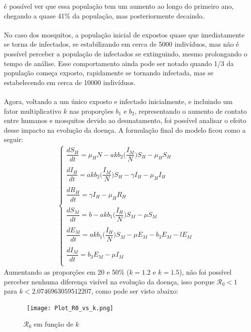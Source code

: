 é possível ver que essa população tem um aumento ao longo do primeiro ano, 
chegando a quase 41\% da população, mas posteriormente decaindo.
\\\\
No caso dos mosquitos, a população inicial de expostos quase que 
imediatamente se torna de infectados, se estabilizando em cerca de 5000 
indivíduos, mas não é possível perceber a população de infectados se 
extinguindo, mesmo prolongando o tempo de análise. Esse comportamento 
ainda pode ser notado quando 1/3 da população começa exposto, rapidamente 
se tornando infectada, mas se estabelecendo em cerca de 10000 indivíduos. 
\\\\
Agora, voltando a um único exposto e infectado inicialmente, e incluindo um fator
multiplicativo $k$ nas proporções $b_1$ e $b_2$, representando o aumento de contato
entre humanos e mosquitos devido ao desmatamento, foi possível analisar o efeito desse impacto
na evolução da doença. A formulação final do modelo ficou como a seguir:
\begin{gather*}
\begin{cases}
\dfrac{dS_H}{dt} = \mu_HN-akb_2\bigg(\dfrac{I_M}{N}\bigg)S_H - \mu_HS_H\\
\\
\dfrac{dI_H}{dt} = akb_2\bigg(\dfrac{I_M}{N}\bigg)S_H-\gamma I_H - \mu_HI_H\\
\\
\dfrac{dR_H}{dt} = \gamma I_H - \mu_HR_H\\
\\
\dfrac{dS_M}{dt} = b - akb_1\bigg(\dfrac{I_H}{N}\bigg)S_M - \mu S_M\\
\\
\dfrac{dE_M}{dt} = akb_1\bigg(\dfrac{I_H}{N}\bigg)S_M - \mu E_M - b_3E_M -lE_M\\
\\
\dfrac{dI_M}{dt} = b_3E_M -\mu I_M\\
\end{cases}
\end{gather*}
Aumentando as proporções em 20 e 50\% ($k=1.2$ e $k=1.5$), não foi possível perceber
nenhuma diferença visível na evolução da doença, isso porque $\mathcal{R}_0 < 1$  
para $k < 2.0746963059512207$, como pode ser visto abaixo:
\begin{figure}[!ht]
        \centering
        \hbox{\hspace{3em} \texttt{[image: Plot\_R0\_vs\_k.png]}}
        \caption{$\mathcal{R}_0$ em função de $k$}
\end{figure} 
